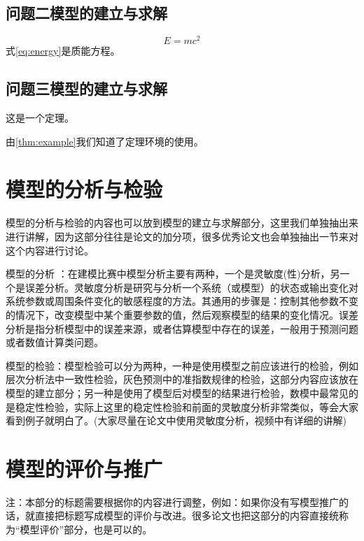 \documentclass[withoutpreface,bwprint]{cumcmthesis} %
\begin{document}
\subsection{问题二模型的建立与求解}

\begin{equation}
E=mc^2
\label{eq:energy}
\end{equation}
式\cref{eq:energy}是质能方程。

\subsection{问题三模型的建立与求解}

\begin{theorem}
    这是一个定理。
    \label{thm:example}
\end{theorem}
由\cref{thm:example}我们知道了定理环境的使用。

\section{模型的分析与检验}

模型的分析与检验的内容也可以放到模型的建立与求解部分，这里我们单独抽出来进行讲解，因为这部分往往是论文的加分项，很多优秀论文也会单独抽出一节来对这个内容进行讨论。

模型的分析 ：在建模比赛中模型分析主要有两种，一个是灵敏度(性)分析，另一个是误差分析。灵敏度分析是研究与分析一个系统（或模型）的状态或输出变化对系统参数或周围条件变化的敏感程度的方法。其通用的步骤是：控制其他参数不变的情况下，改变模型中某个重要参数的值，然后观察模型的结果的变化情况。误差分析是指分析模型中的误差来源，或者估算模型中存在的误差，一般用于预测问题或者数值计算类问题。

模型的检验：模型检验可以分为两种，一种是使用模型之前应该进行的检验，例如层次分析法中一致性检验，灰色预测中的准指数规律的检验，这部分内容应该放在模型的建立部分；另一种是使用了模型后对模型的结果进行检验，数模中最常见的是稳定性检验，实际上这里的稳定性检验和前面的灵敏度分析非常类似，等会大家看到例子就明白了。(大家尽量在论文中使用灵敏度分析，视频中有详细的讲解)

\section{模型的评价与推广}

注：本部分的标题需要根据你的内容进行调整，例如：如果你没有写模型推广的话，就直接把标题写成模型的评价与改进。很多论文也把这部分的内容直接统称为“模型评价”部分，也是可以的。
\end{document}
